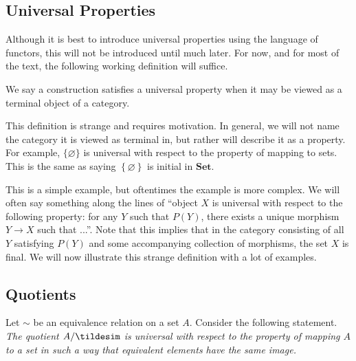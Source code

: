 \subsection{Universal Properties}
Although it is best to introduce universal properties using the language of functors, this will not be introduced until much later. For now, and for most of the text, the following working definition will suffice.
\begin{definition}\label{dfn:1.5.2}
	We say a construction satisfies a universal property when it may be viewed as a terminal object of a category.
\end{definition}
This definition is strange and requires motivation. In general, we will not name the category it is viewed as terminal in, but rather will describe it as a property. For example, $\{\varnothing\}$ is universal with respect to the property of mapping to sets. This is the same as saying $\left\{ \varnothing \right\} $ is initial in $\mathbf{Set}$.

This is a simple example, but oftentimes the example is more complex. We will often say something along the lines of ``object $X$ is universal with respect to the following property: for any $Y$ such that $P(Y)$, there exists a unique morphism $Y\to X$ such that ...''. Note that this implies that in the category consisting of all  $Y$ satisfying $P(Y)$ and some accompanying collection of morphisms, the set $X$ is final. We will now illustrate this strange definition with a lot of examples.
\subsection{Quotients}
Let $\sim $ be an equivalence relation on a set $A$. Consider the following statement. \emph{The quotient $A /\tildesim $ is universal with respect to the property of mapping $A$ to a set in such a way that equivalent elements have the same image.}

